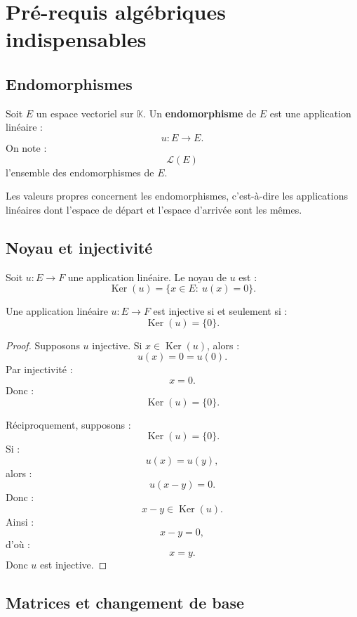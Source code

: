 \documentclass[11pt,a4paper]{article}
\newcommand{\K}{\mathbb K}
\newcommand{\Lcal}{\mathcal L}
\newcommand{\Ker}{\operatorname{Ker}}
\begin{document}
\section{Pré-requis algébriques indispensables}

\subsection{Endomorphismes}

\begin{definitionbox}[Endomorphisme]
Soit \(E\) un espace vectoriel sur \(\K\).  
Un \textbf{endomorphisme} de \(E\) est une application linéaire :
\[
u:E\to E.
\]
On note :
\[
\Lcal(E)
\]
l'ensemble des endomorphismes de \(E\).
\end{definitionbox}

\begin{retenirbox}
Les valeurs propres concernent les endomorphismes, c'est-à-dire les applications linéaires dont l'espace de départ et l'espace d'arrivée sont les mêmes.
\end{retenirbox}

\subsection{Noyau et injectivité}

\begin{definitionbox}[Noyau]
Soit \(u:E\to F\) une application linéaire.  
Le noyau de \(u\) est :
\[
\Ker(u)=\{x\in E:\ u(x)=0\}.
\]
\end{definitionbox}

\begin{theorembox}
Une application linéaire \(u:E\to F\) est injective si et seulement si :
\[
\Ker(u)=\{0\}.
\]
\end{theorembox}

\begin{proof}
Supposons \(u\) injective.  
Si \(x\in\Ker(u)\), alors :
\[
u(x)=0=u(0).
\]
Par injectivité :
\[
x=0.
\]
Donc :
\[
\Ker(u)=\{0\}.
\]

Réciproquement, supposons :
\[
\Ker(u)=\{0\}.
\]
Si :
\[
u(x)=u(y),
\]
alors :
\[
u(x-y)=0.
\]
Donc :
\[
x-y\in\Ker(u).
\]
Ainsi :
\[
x-y=0,
\]
d'où :
\[
x=y.
\]
Donc \(u\) est injective.
\end{proof}

\subsection{Matrices et changement de base}
\end{document}
